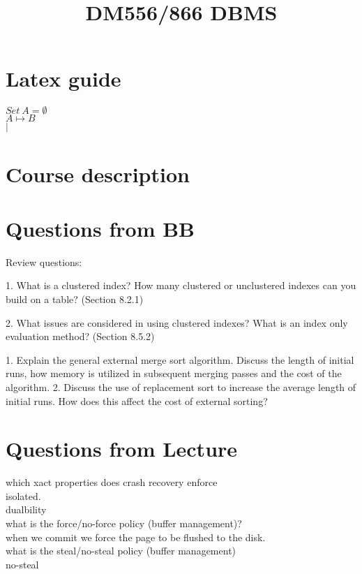 \documentclass[a4paper,10pt,titlepage]{report}
\date{}
\title{DM556/866 DBMS}
\begin{document}
\renewcommand{\thepage}{\roman{page}}%
\tableofcontents
\newpage
\setcounter{page}{1}
\renewcommand{\thepage}{\arabic{page}}
\section{Latex guide}
$
Set \ A = \emptyset 
$
\\
$
A \mapsto B
$
\\
$
\mid
$


\section{Course description}


\section{Questions from BB}
Review questions:

1. What is a clustered index? How many clustered or unclustered indexes can you build on a table? (Section 8.2.1)

2. What issues are considered in using clustered indexes? What is an index only evaluation method? (Section 8.5.2)

1. Explain the general external merge sort algorithm. Discuss the length of initial runs, how memory is utilized in subsequent merging passes and the cost of the algorithm.
2. Discuss the use of replacement sort to increase the average length of initial runs. How does this affect the cost of external sorting? 


\section{Questions from Lecture}
which xact properties does crash recovery enforce\\
\hspace{10mm}	isolated.\\
\hspace{10mm}	dualbility\\

what is the force/no-force policy (buffer management)?  \\
\hspace{10mm}	when we commit we force the page to be flushed to the disk. \\

what is the steal/no-steal policy (buffer management)\\
\hspace{10mm}	no-steal \\
		
\end{document}
